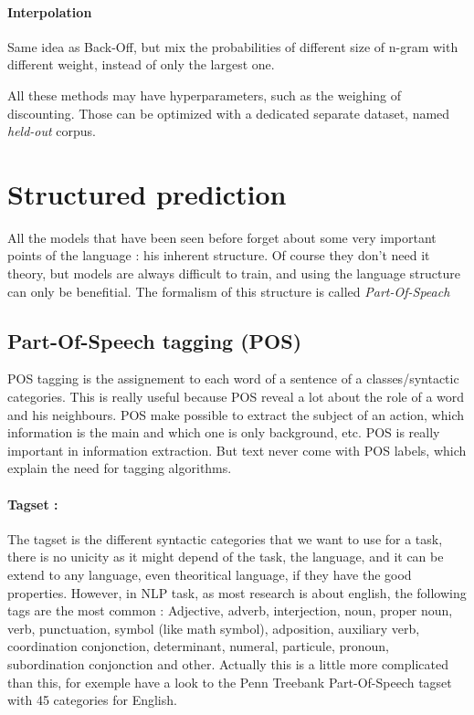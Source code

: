			\paragraph*{Interpolation}
				Same idea as Back-Off, but mix the probabilities of different size of n-gram with different weight, instead of only the largest one.

			All these methods may have hyperparameters, such as the weighing of discounting. Those can be optimized with a dedicated separate dataset, named \emph{held-out} corpus.

	\section{Structured prediction}

		All the models that have been seen before forget about some very important points of the language : his inherent structure. Of course they don't need it theory, but models are always difficult to train, and using the language structure can only be benefitial. The formalism of this structure is called \emph{Part-Of-Speach}

		\subsection{Part-Of-Speech tagging (POS)}

			POS tagging is the assignement to each word of a sentence of a classes/syntactic categories. This is really useful because POS reveal a lot about the role of a word and his neighbours. POS make possible to extract the subject of an action, which information is the main and which one is only background, etc. POS is really important in information extraction. But text never come with POS labels, which explain the need for tagging algorithms. 

			\paragraph*{Tagset : } 
				The tagset is the different syntactic categories that we want to use for a task, 	there is no unicity as it might depend of the task, the language, and it can be extend to any language, even theoritical language, if they have the good properties. However, in NLP task, as most research is about english, the following tags are the most common : Adjective, adverb, interjection, noun, proper noun, verb, punctuation, symbol (like math symbol), adposition, auxiliary verb, coordination conjonction, determinant, numeral, particule, pronoun, subordination conjonction and other. Actually this is a little more complicated than this, for exemple have a look to the Penn Treebank Part-Of-Speech tagset with 45 categories for English.

